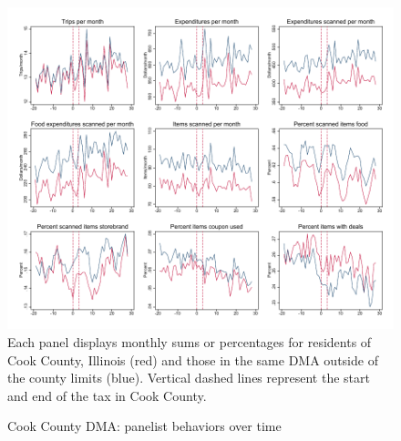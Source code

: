 \documentclass[12pt]{article}
\begin{document}
\clearpage
% 
\label{tableshortrun}


\clearpage
\begin{figure}[t]
\begin{center}
\caption{Cook County DMA: panelist behaviors over time}
\label{cook_panelist_behav}
\includegraphics[width=1\textwidth, angle=0]{../figures/panelist_behav.pdf}
\footnotesize Each panel displays monthly sums or percentages for residents of Cook County, Illinois (red) and those in the same DMA outside of the county limits (blue). Vertical dashed lines represent the start and end of the tax in Cook County.
\end{center}
\end{figure}
\end{document}
